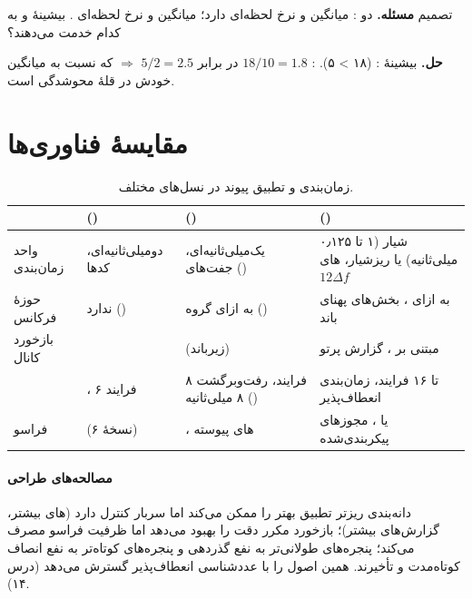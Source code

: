 \documentclass[11pt,a4paper]{article}
\begin{document}
\begin{examplebox}{تصمیم }\label{ex:pf}
\textbf{مسئله.} دو :  میانگین  و نرخ لحظه‌ای  دارد؛  میانگین
 و نرخ لحظه‌ای . بیشینهٔ  و  به کدام خدمت می‌دهند؟

\textbf{حل.} بیشینهٔ :  (۱۸ > ۵). : $18/10 = 1.8$ در برابر $5/2 = 2.5$ $\Rightarrow$  که
نسبت به میانگین خودش در قلهٔ محوشدگی است.
\end{examplebox}

\section{مقایسهٔ فناوری‌ها}
\begin{table}[htbp]
\centering\small
\caption{زمان‌بندی و تطبیق پیوند در نسل‌های مختلف.}\label{tab:gens}
\begin{tabularx}{\linewidth}{@{}l Y Y Y@{}}
\toprule
{} &  () &  () &  () \\
\midrule
واحد زمان‌بندی    &  دومیلی‌ثانیه‌ای، کدها &  یک‌میلی‌ثانیه‌ای، جفت‌های  () & شیار (۱ تا ۰٫۱۲۵ میلی‌ثانیه) یا ریزشیار، های $12\Delta f$ \\
حوزهٔ فرکانس      & ندارد ()          & به ازای گروه  () & به ازای ، بخش‌های پهنای باند \\
بازخورد کانال     &                    &  (زیرباند)       & مبتنی بر ، گزارش پرتو \\
       & ، ۶ فرایند         & ۸ فرایند، رفت‌وبرگشت ۸ میلی‌ثانیه () & تا ۱۶ فرایند، زمان‌بندی انعطاف‌پذیر \\
فراسو             &  (نسخهٔ ۶)          & ، های پیوسته &  یا ، مجوزهای پیکربندی‌شده \\
\bottomrule
\end{tabularx}
\end{table}

\paragraph{مصالحه‌های طراحی} دانه‌بندی ریزتر تطبیق بهتر را ممکن می‌کند اما سربار کنترل دارد (های بیشتر،
گزارش‌های  بیشتر)؛ بازخورد مکرر دقت را بهبود می‌دهد اما ظرفیت فراسو مصرف می‌کند؛ پنجره‌های طولانی‌تر
 به نفع گذردهی و پنجره‌های کوتاه‌تر به نفع انصاف کوتاه‌مدت و تأخیرند.  همین اصول را با عدد‌شناسی
انعطاف‌پذیر گسترش می‌دهد (درس ۱۴).
\end{document}
